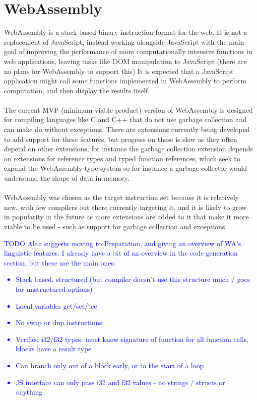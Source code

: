 \documentclass[12pt,twoside,notitlepage]{report}
\newcommand\note[1]{\textcolor{blue}{#1}}
\begin{document}
\section{WebAssembly}
WebAssembly\cite{webassembly} is a stack-based binary instruction format for the web. It is not a replacement of JavaScript, instead working alongside JavaScript with the main goal of improving the performance of  more computationally intensive functions in web applications, leaving tasks like DOM manipulation to JavaScript (there are no plans for WebAssembly to support this) It  is  expected  that  a  JavaScript  application might  call  some  functions  implemented  in  WebAssembly  to  perform  computation,  and then display the results itself.
\\\\
The current MVP (minimum viable product) version of WebAssembly is designed for compiling languages like C and C++ that do not use garbage collection and can make do without exceptions. There are extensions currently being developed to add support for these features, but progress on these is slow as they often depend on other extensions, for instance the garbage collection extension depends on extensions for reference types and typed function references, which seek to expand the WebAssembly type system so for instance a garbage collector would understand the shape of data in memory\cite{Wgce}.
\\\\
WebAssembly was chosen as the target instruction set because it is relatively new, with few compilers out there currently targeting it, and it is likely to grow in popularity in the future as more extensions are added to it that make it more viable to be used - such as support for garbage collection and exceptions.

\note{TODO Alan suggests moving to Preparation, and giving an overview of WA's linguistic features. I already have a bit of an overview in the code generation section, but these are the main ones:
\begin{itemize}
	\item Stack based, structured (but compiler doesn't use this structure much / goes for unstructured options)
	\item Local variables get/set/tee
	\item No swap or dup instructions
	\item Verified i32/f32 types, must know signature of function for all function calls, blocks have a result type
	\item Can branch only out of a block early, or to the start of a loop
	\item JS interface can only pass i32 and f32 values - no strings / structs or anything
\end{itemize}}
\end{document}
